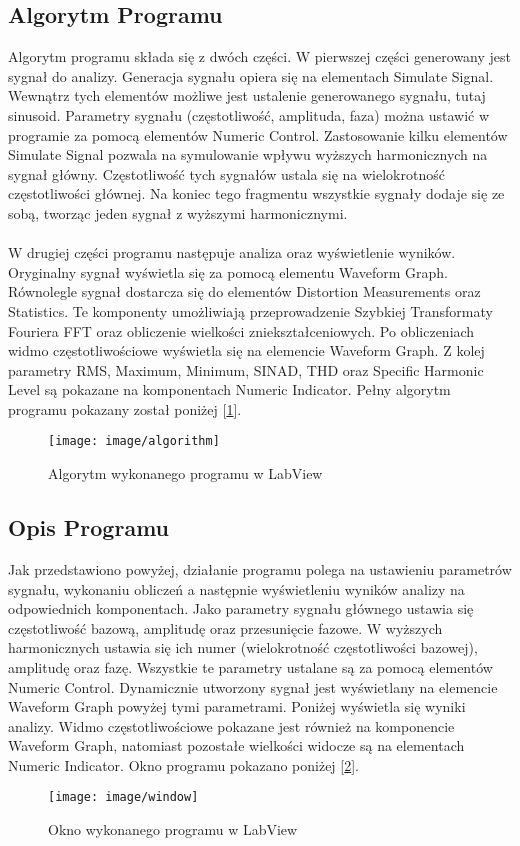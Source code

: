 \documentclass{article} %
\newcommand{\forceindent}{\leavevmode{\parindent=1cm\indent}} %
\begin{document}
		\subsection{Algorytm Programu}
			\forceindent Algorytm programu składa się z dwóch części. W pierwszej części generowany jest sygnał do analizy. Generacja sygnału opiera się na elementach Simulate Signal. Wewnątrz tych elementów możliwe jest ustalenie generowanego sygnału, tutaj sinusoid. Parametry sygnału (częstotliwość, amplituda, faza) można ustawić w programie za pomocą elementów Numeric Control. Zastosowanie kilku elementów Simulate Signal pozwala na symulowanie wpływu wyższych harmonicznych na sygnał główny. Częstotliwość tych sygnałów ustala się na wielokrotność częstotliwości głównej. Na koniec tego fragmentu wszystkie sygnały dodaje się ze sobą, tworząc jeden sygnał z wyższymi harmonicznymi.
			\\ \\
			\forceindent W drugiej części programu następuje analiza oraz wyświetlenie wyników. Oryginalny sygnał wyświetla się za pomocą elementu Waveform Graph. Równolegle sygnał dostarcza się do elementów Distortion Measurements oraz Statistics. Te komponenty umożliwiają przeprowadzenie Szybkiej Transformaty Fouriera FFT oraz obliczenie wielkości zniekształceniowych. Po obliczeniach widmo częstotliwościowe wyświetla się na elemencie Waveform Graph. Z kolej parametry RMS, Maximum, Minimum, SINAD, THD oraz Specific Harmonic Level są pokazane na komponentach Numeric Indicator. Pełny algorytm programu pokazany został poniżej [\ref{fig:algorytm}].
			\newpage \forceindent
			\begin{figure}[h!]
				\centering
				\texttt{[image: image/algorithm]}
				\caption[Algorytm Programu]{Algorytm wykonanego programu w LabView}
				\label{fig:algorytm}
			\end{figure}
		\subsection{Opis Programu}
			\forceindent Jak przedstawiono powyżej, działanie programu polega na ustawieniu parametrów sygnału, wykonaniu obliczeń a następnie wyświetleniu wyników analizy na odpowiednich komponentach. Jako parametry sygnału głównego ustawia się częstotliwość bazową, amplitudę oraz przesunięcie fazowe. W wyższych harmonicznych ustawia się ich numer (wielokrotność częstotliwości bazowej), amplitudę oraz fazę. Wszystkie te parametry ustalane są za pomocą elementów Numeric Control. Dynamicznie utworzony sygnał jest wyświetlany na elemencie Waveform Graph powyżej tymi parametrami. Poniżej wyświetla się wyniki analizy. Widmo częstotliwościowe pokazane jest również na komponencie Waveform Graph, natomiast pozostałe wielkości widocze są na elementach Numeric Indicator. Okno programu pokazano poniżej [\ref{fig:window}].
			\newpage \forceindent
			\begin{figure}[h!]
				\centering
				\texttt{[image: image/window]}
				\caption[Okno Programu]{Okno wykonanego programu w LabView}
				\label{fig:window}
			\end{figure}
\end{document}
